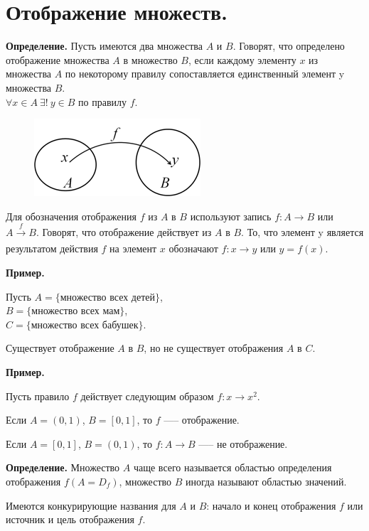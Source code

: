 \documentclass{article}
\begin{document}
    \section{Отображение множеств.}

    \textbf{Определение.} Пусть имеются два множества $A$ и $B$. Говорят, что определено отображение множества $A$ в множество $B$, если каждому элементу $x$ из множества $A$ по некоторому правилу сопоставляется единственный элемент y множества $B$.\\
    $\forall x \in A\ \exists!\ y \in B$ по правилу $f$.
    
    \begin{figure}[h!]
    \centering
    \includegraphics[scale=0.75]{1}
    \end{figure}

    Для обозначения отображения $f$ из $A$ в $B$ используют запись $f: A \rightarrow B$ или $A \xrightarrow[]{f} B$. Говорят, что отображение действует из $A$ в $B$. То, что элемент y является результатом действия $f$ на элемент $x$ обозначают $f: x \rightarrow y$ или $y = f(x)$.

    \textbf{Пример.}

    Пусть $A = \{$множество всех детей$\}$,\\
    $B = \{$множество всех мам$\}$,\\
    $C = \{$множество всех бабушек$\}$.

    Существует отображение $A$ в $B$, но не существует отображения $A$ в $C$.  
    
    \textbf{Пример.}
    
    Пусть правило $f$ действует следующим образом $f: x \rightarrow x^2$.
    
    Если $A = (0, 1)$, $B = [0, 1]$, то $f$ —-- отображение.
    
    Если $A = [0, 1]$, $B = (0, 1)$, то $f: A \rightarrow B$ —-- не отображение. 

    \textbf{Определение.} Множество $A$ чаще всего называется областью определения отображения $f (A = D_f)$, множество $B$ иногда называют областью значений.

    Имеются конкурирующие названия для $A$ и $B$: начало и конец отображения $f$ или источник и цель отображения $f$. 
    
\end{document}
